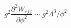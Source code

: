 \begin{equation}
g^2 \frac{\partial^2 W_{eff}}{\partial\phi^2} 
\sim g^2 \Lambda^3/\phi^2
\end{equation}


